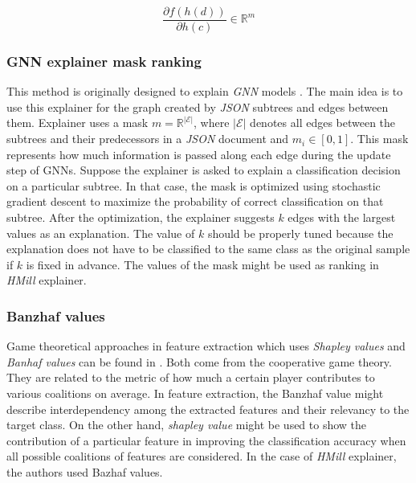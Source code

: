\begin{equation} \label{eq:grad}
    \frac{\partial f(h(d))}{\partial h(c)} \in \mathbb{R}^m
\end{equation}


\subsubsection{GNN explainer mask ranking}
This method is originally designed to explain \emph{GNN} models \cite{Ying2019}. The main idea is to use this explainer for the graph created by \emph{JSON} subtrees and edges between them. Explainer uses a mask $m=\mathbb{R}^{|\mathcal{E}|}$, where $|\mathcal{E}|$ denotes all edges between the subtrees and their predecessors in a \emph{JSON} document and $m_i\in[0,1]$. This mask represents how much information is passed along each edge during the update step of GNNs. Suppose the explainer is asked to explain a classification decision on a particular subtree. In that case, the mask is optimized using stochastic gradient descent to maximize the probability of correct classification on that subtree. After the optimization, the explainer suggests $k$ edges with the largest values as an explanation. The value of $k$ should be properly tuned because the explanation does not have to be classified to the same class as the original sample if $k$ is fixed in advance. The values of the mask might be used as ranking in \emph{HMill} explainer.

\subsubsection{Banzhaf values}
Game theoretical approaches in feature extraction which uses \emph{Shapley values} and \emph{Banhaf values} can be found in \cite{Afghah2018}. Both come from the cooperative game theory. They are related to the metric of how much a certain player contributes to various coalitions on average. In feature extraction, the Banzhaf value might describe interdependency among the extracted features and their relevancy to the target class. On the other hand, \emph{shapley value} might be used to show the contribution of a particular feature in improving the classification accuracy when all possible coalitions of features are considered. In the case of \emph{HMill} explainer, the authors used Bazhaf values. 

